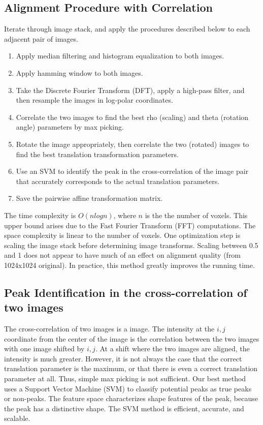 \documentclass{article}
\begin{document}
\subsection{Alignment Procedure with Correlation}
Iterate through image stack, and apply the procedures described below to each adjacent pair of images.
\begin{enumerate}
\item Apply median filtering and histogram equalization to both images.
\item Apply hamming window to both images. 
\item Take the Discrete Fourier Transform (DFT), apply a high-pass filter, and then resample the images in log-polar coordinates. 
\item Correlate the two images to find the best rho (scaling) and theta (rotation angle) parameters by max picking.
\item Rotate the image appropriately, then correlate the two (rotated) images to find the best translation transformation parameters.
\item Use an SVM to identify the peak in the cross-correlation of the image pair that accurately corresponds to the actual translation parameters.
\item Save the pairwise affine transformation matrix. 
\end{enumerate}The time complexity is $O(nlogn)$, where $n$ is the the number of voxels. This upper bound arises due to the Fast Fourier Transform (FFT) computations. The space complexity is linear to the number of voxels. One optimization step is scaling the image stack before determining image transforms. Scaling between 0.5 and 1 does not appear to have much of an effect on alignment quality (from 1024x1024 original). In practice, this method greatly improves the running time. \\

\subsection{Peak Identification in the cross-correlation of two images}
The cross-correlation of two images is a image. The intensity at the $i,j$ coordinate from the center of the image is the correlation between the two images with one image shifted by $i,j$. At a shift where the two images are aligned, the intensity is much greater. However, it is not always the case that the correct translation parameter is the maximum, or that there is even a correct translation parameter at all. Thus, simple max picking is not sufficient. Our best method uses a Support Vector Machine (SVM) to classify potential peaks as true peaks or non-peaks. The feature space characterizes shape features of the peak, because the peak has a distinctive shape. The SVM method is efficient, accurate, and scalable. 
\end{document}

